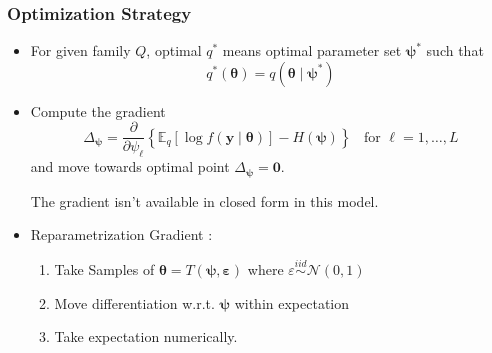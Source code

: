 \documentclass[aspectratio=169,10pt]{beamer}
\begin{document}
\begin{frame}
    \frametitle{Optimization Strategy}
    \begin{itemize}
    \item For given family $Q$, optimal $q^*$ means optimal parameter set 
        $\bm{\psi}^*$ such that
        \[
            q^*(\bm{\theta}) = q(\bm{\theta}\mid\bm{\psi}^*)
        \]
    \item Compute the gradient
        \[
            \Delta_{\bm{\psi}} = \frac{\partial}{\partial \psi_{\ell}}
                \left\lbrace\mathbb{E}_{q}\left[\log f(\bm{y}\mid\bm{\theta})\right] 
                    - H(\bm{\psi})\right\rbrace
                \;\;\text{ for }\ell = 1,\ldots,L
        \]
    and move towards optimal point $\Delta_{\bm{\psi}} = \bm{0}$.

    The gradient isn't available in closed form in this model.
    \item Reparametrization Gradient \cite{kingma2022}:
        \begin{enumerate}
            \item Take Samples of $\bm{\theta} = T(\bm{\psi}, \bm{\varepsilon})$ 
                where $\varepsilon \stackrel{iid}{\sim} \mathcal{N}(0,1)$
            \item Move differentiation w.r.t. $\bm{\psi}$ within expectation
            \item Take expectation numerically.
        \end{enumerate}
    \end{itemize}
\end{frame} %
\end{document}

